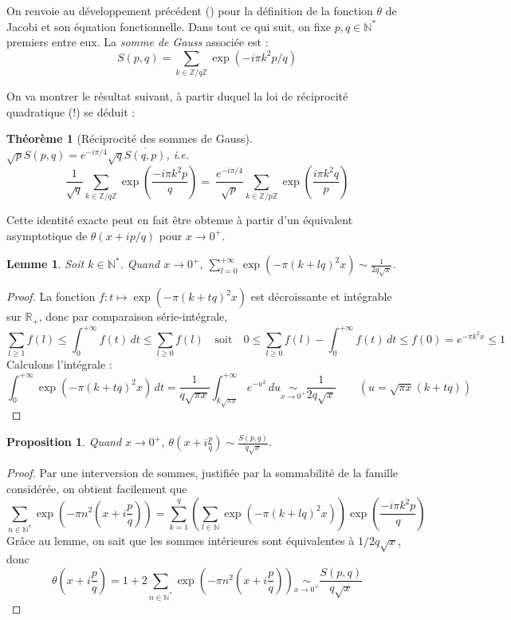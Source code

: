 \documentclass[a4paper, 11pt]{article}
\def\Z{\mathbb{Z}}
\def\N{\mathbb{N}}
\def\R{\mathbb{R}}
\newtheorem*{proposition}{Proposition}
\newtheorem*{theorem}{Théorème}
\newtheorem*{lemma}{Lemme}
\begin{document}
On renvoie au développement précédent () pour la définition de
la fonction $\theta$ de Jacobi et son équation fonctionnelle. Dans tout ce qui
suit, on fixe $p, q \in \N^*$ premiers entre eux. La \emph{somme de Gauss}
associée est :
\[S(p,q) = \sum_{k \in \Z/q\Z} \exp(-i\pi k^2 p/q) \]

On va montrer le résultat suivant, à partir duquel la loi de réciprocité
quadratique (!) se déduit :

\begin{theorem}[Réciprocité des sommes de Gauss]
  $\sqrt{p}S(p,q) = e^{-i\pi/4}\sqrt{q}\overline{S(q,p)}$, i.e.
  \[ \frac{1}{\sqrt{q}} \sum_{k \in \Z/q\Z}
    \exp\left(\frac{-i\pi k^2 p}{q}\right) =
    \ \frac{e^{-i\pi/4}}{\sqrt{p}} \sum_{k \in \Z/p\Z}
    \exp\left(\frac{i\pi k^2 q}{p}\right) \]
\end{theorem}

Cette identité exacte peut en fait être obtenue à partir d'un équivalent
asymptotique de $\theta(x + ip/q)$ pour $x \to 0^+$.

\begin{lemma} Soit $k \in \N^*$. Quand $x \to 0^+$,
  $\displaystyle \sum_{l = 0}^{+\infty} \exp(-\pi(k+lq)^2x)
  \sim \frac{1}{2q\sqrt{x}}$.
\end{lemma}

\begin{proof}
  La fonction $f : t \mapsto \exp(-\pi(k+tq)^2x)$ est décroissante et intégrable
  sur $\R_+$, donc par comparaison série-intégrale,
 \[ \sum_{l \geq 1} f(l) \leq \int_0^{+\infty} f(t)\,dt \leq
   \sum_{l \geq 0} f(l) \quad \text{soit} \quad
   0 \leq \sum_{l \geq 0} f(l) - \int_0^{+\infty} f(t)\,dt \leq f(0) =
   e^{-\pi k^2 x} \leq 1
 \]
 Calculons l'intégrale :
 \[ \int_0^{+\infty} \exp(-\pi(k+tq)^2x)\,dt =
   \frac{1}{q\sqrt{\pi x}} \int_{k\sqrt{\pi x}}^{+\infty} e^{-u^2}\,du
    \underset{x \to 0^+}{\sim} \frac{1}{2q\sqrt{x}}
   \qquad
  (u = \sqrt{\pi x}(k + tq))
\]
\end{proof}

\begin{proposition}
  Quand $x \to 0^+$,
  $\displaystyle \theta\left( x + i\frac{p}{q} \right)
  \sim \frac{S(p,q)}{q\sqrt{x}}$.
\end{proposition}

\begin{proof}
  Par une interversion de sommes, justifiée par la sommabilité
  de la famille considérée, on obtient facilement que
  \[ \sum_{n \in \N^*} \exp\left(-\pi n^2 \left( x + i\frac{p}{q}  \right)\right)
    = \sum_{k = 1}^q \left( \sum_{l \in \N} \exp(-\pi(k+lq)^2x) \right)
    \exp\left(\frac{-i\pi k^2 p}{q} \right)
  \]
  Grâce au lemme, on sait que les sommes intérieures sont équivalentes à
  $1/2q\sqrt{x}$, donc
\[ \theta\left( x + i\frac{p}{q} \right) = 1 + 2 \sum_{n \in \N^*}
  \exp\left(-\pi n^2 \left( x + i\frac{p}{q} \right)\right)
      \underset{x \to 0^+}{\sim} \frac{S(p,q)}{q\sqrt{x}}
\]
\end{proof}
\end{document}
